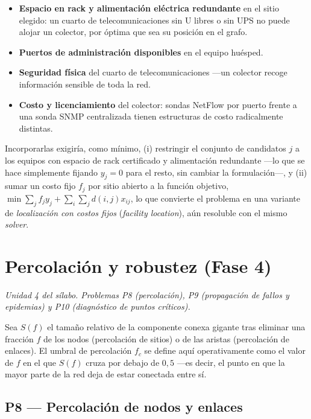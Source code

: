\documentclass[10pt,a4paper]{extarticle}
\begin{document}
\begin{itemize}[leftmargin=*,itemsep=1mm]
\item \textbf{Espacio en rack y alimentación eléctrica redundante} en el sitio elegido: un
cuarto de telecomunicaciones sin U libres o sin UPS no puede alojar un colector, por óptima
que sea su posición en el grafo.
\item \textbf{Puertos de administración disponibles} en el equipo huésped.
\item \textbf{Seguridad física} del cuarto de telecomunicaciones ---un colector recoge
información sensible de toda la red.
\item \textbf{Costo y licenciamiento} del colector: sondas NetFlow por puerto frente a una
sonda SNMP centralizada tienen estructuras de costo radicalmente distintas.
\end{itemize}

Incorporarlas exigiría, como mínimo, (i) restringir el conjunto de candidatos $j$ a los
equipos con espacio de rack certificado y alimentación redundante ---lo que se hace
simplemente fijando $y_j = 0$ para el resto, sin cambiar la formulación---, y (ii) sumar un
costo fijo $f_j$ por sitio abierto a la función objetivo,
$\min \sum_j f_j y_j + \sum_i \sum_j d(i,j) x_{ij}$, lo que convierte el problema en una
variante de \textit{localización con costos fijos} (\textit{facility location}), aún
resoluble con el mismo \textit{solver}.

\newpage
\section{Percolación y robustez (Fase 4)}
\label{sec:p8}

\textit{Unidad 4 del sílabo. Problemas P8 (percolación), P9 (propagación de fallos y
epidemias) y P10 (diagnóstico de puntos críticos).}

Sea $S(f)$ el tamaño relativo de la componente conexa gigante tras eliminar una fracción
$f$ de los nodos (percolación de sitios) o de las aristas (percolación de enlaces). El
umbral de percolación $f_c$ se define aquí operativamente como el valor de $f$ en el que
$S(f)$ cruza por debajo de $0{,}5$ ---es decir, el punto en que la mayor parte de la red
deja de estar conectada entre sí.

\subsection{P8 --- Percolación de nodos y enlaces}
\end{document}
